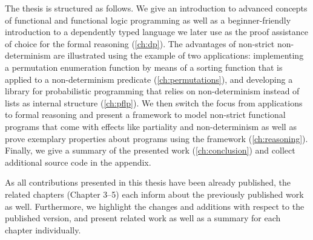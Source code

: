 The thesis is structured as follows. We give an introduction to advanced concepts of functional and functional logic programming as well as a beginner\--friendly introduction to a dependently typed language we later use as the proof assistance of choice for the formal reasoning (\autoref{ch:dp}).
The advantages of non\--strict non\--determinism are illustrated using the example of two applications: implementing a permutation enumeration function by means of a sorting function that is applied to a non\--determinism predicate (\autoref{ch:permutations}), and developing a library for probabilistic programming that relies on non\--determinism instead of lists as internal structure (\autoref{ch:pflp}).
We then switch the focus from applications to formal reasoning and present a framework to model non\--strict functional programs that come with effects like partiality and non\--determinism as well as prove exemplary properties about programs using the framework (\autoref{ch:reasoning}).
Finally, we give a summary of the presented work (\autoref{ch:conclusion}) and collect additional source code in the appendix.

As all contributions presented in this thesis have been already published, the related chapters (Chapter 3--5) each inform about the previously published work as well.
Furthermore, we highlight the changes and additions with respect to the published version, and present related work as well as a summary for each chapter individually.